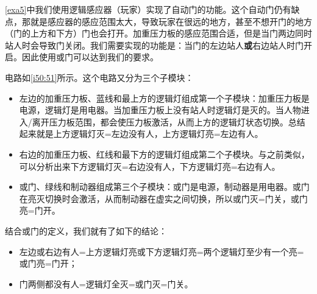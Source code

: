 \begin{example}[改进自动门]

\autoref{exa5}中我们使用逻辑感应器（玩家）实现了自动门的功能。这个自动门仍有缺点，那就是感应器的感应范围太大，导致玩家在很远的地方，甚至不想开门的地方（门的上方和下方）门也会打开。加重压力板的感应范围合适，但是当门两边同时站人时会导致门关闭。我们需要实现的功能是：当门的左边站人\textbf{或}右边站人时门开启。因此使用或门可以达到我们的要求。

\begin{figure}[!ht]
\begin{center}
\end{center}
\caption{}
\label{i50:51}
\end{figure}

电路如\autoref{i50:51}所示。这个电路又分为三个子模块：
\begin{itemize}
\item 左边的加重压力板、蓝线和最上方的逻辑灯组成第一个子模块：加重压力板是电源，逻辑灯是用电器。当加重压力板上没有站人时逻辑灯是灭的。当人物进入/离开压力板范围，都会使压力板激活，从而上方的逻辑灯状态切换。总结起来就是上方逻辑灯灭=左边没有人，上方逻辑灯亮=左边有人。
\item 右边的加重压力板、红线和最下方的逻辑灯组成第二个子模块。与之前类似，可以分析出来下方逻辑灯灭=右边没有人，下方逻辑灯亮=右边有人。
\item 或门、绿线和制动器组成第三个子模块：或门是电源，制动器是用电器。或门在亮灭切换时会激活，从而制动器在虚实之间切换，所以或门灭=门关，或门亮=门开。
\end{itemize}

结合或门的定义，我们就有了如下的结论：
\begin{itemize}
\item 左边或右边有人=上方逻辑灯亮或下方逻辑灯亮=两个逻辑灯至少有一个亮=或门亮=门开；
\item 门两侧都没有人=逻辑灯全灭=或门灭=门关。
\end{itemize}


\end{example}
